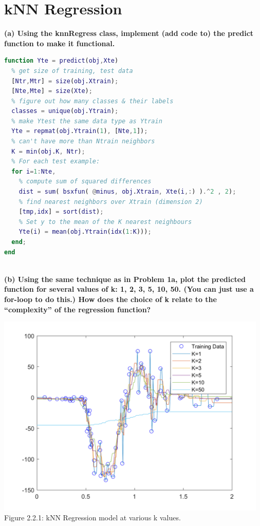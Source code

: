 \documentclass[]{report}   %
\begin{document}
\section{kNN Regression}
{\bf (a) Using the knnRegress class, implement (add code to) the predict function to make it functional.}
\begin{lstlisting}[language=Matlab, caption=predict() Implementation]
% Test function: predict on Xtest
function Yte = predict(obj,Xte)
  % get size of training, test data
  [Ntr,Mtr] = size(obj.Xtrain);
  [Nte,Mte] = size(Xte);
  % figure out how many classes & their labels
  classes = unique(obj.Ytrain);        
  % make Ytest the same data type as Ytrain  
  Yte = repmat(obj.Ytrain(1), [Nte,1]);  
  % can't have more than Ntrain neighbors
  K = min(obj.K, Ntr);                  
  % For each test example:
  for i=1:Nte,                
    % compute sum of squared differences          
    dist = sum( bsxfun( @minus, obj.Xtrain, Xte(i,:) ).^2 , 2);  
    % find nearest neighbors over Xtrain (dimension 2)
    [tmp,idx] = sort(dist);                                                
    % Set y to the mean of the K nearest neighbours
    Yte(i) = mean(obj.Ytrain(idx(1:K)));   
  end;
end
\end{lstlisting}
~\\
{\bf (b) Using the same technique as in Problem 1a, plot the predicted function for several values of k: 1, 2, 3, 5, 10, 50. (You can just use a for-loop to do this.) How does the choice of k relate to the “complexity” of the regression function?}

\begin{center}
	\includegraphics[width=35em]{2_2_Figure_1.png}
	{Figure 2.2.1: kNN Regression model at various k values.}
\end{center} 
\end{document}
